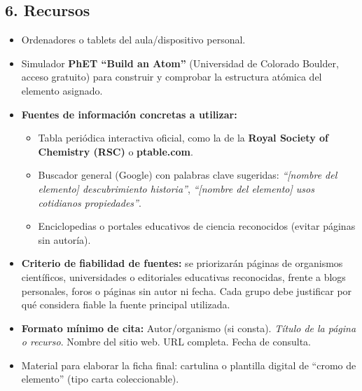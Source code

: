 \documentclass[11pt,a4paper]{article}
\begin{document}
\subsection*{6. Recursos}
\begin{itemize}
    \item Ordenadores o tablets del aula/dispositivo personal.
    \item Simulador \textbf{PhET ``Build an Atom''} (Universidad de Colorado Boulder, acceso gratuito) para construir y comprobar la estructura atómica del elemento asignado.
    \item \textbf{Fuentes de información concretas a utilizar:}
    \begin{itemize}
        \item Tabla periódica interactiva oficial, como la de la \textbf{Royal Society of Chemistry (RSC)} o \textbf{ptable.com}.
        \item Buscador general (Google) con palabras clave sugeridas: \textit{``[nombre del elemento] descubrimiento historia''}, \textit{``[nombre del elemento] usos cotidianos propiedades''}.
        \item Enciclopedias o portales educativos de ciencia reconocidos (evitar páginas sin autoría).
    \end{itemize}
    \item \textbf{Criterio de fiabilidad de fuentes:} se priorizarán páginas de organismos científicos, universidades o editoriales educativas reconocidas, frente a blogs personales, foros o páginas sin autor ni fecha. Cada grupo debe justificar por qué considera fiable la fuente principal utilizada.
    \item \textbf{Formato mínimo de cita:} Autor/organismo (si consta). \textit{Título de la página o recurso}. Nombre del sitio web. URL completa. Fecha de consulta.
    \item Material para elaborar la ficha final: cartulina o plantilla digital de ``cromo de elemento'' (tipo carta coleccionable).
\end{itemize}
\end{document}
